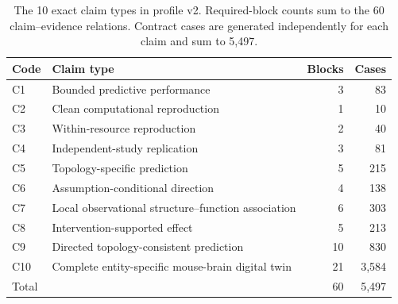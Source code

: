 \begin{table}[!htbp]
\centering
\caption{The 10 exact claim types in profile v2. Required-block counts sum to the 60 claim--evidence relations. Contract cases are generated independently for each claim and sum to 5,497.}
\label{tab:profile-v2-claims}
\footnotesize
\renewcommand{\arraystretch}{1.08}
\begin{tabularx}{\textwidth}{@{}p{}Y r r@{}}
\toprule
Code & Claim type & Blocks & Cases \\
\midrule
C1 & Bounded predictive performance & 3 & 83 \\
C2 & Clean computational reproduction & 1 & 10 \\
C3 & Within-resource reproduction & 2 & 40 \\
C4 & Independent-study replication & 3 & 81 \\
C5 & Topology-specific prediction & 5 & 215 \\
C6 & Assumption-conditional direction & 4 & 138 \\
C7 & Local observational structure--function association & 6 & 303 \\
C8 & Intervention-supported effect & 5 & 213 \\
C9 & Directed topology-consistent prediction & 10 & 830 \\
C10 & Complete entity-specific mouse-brain digital twin & 21 & 3,584 \\
\midrule
Total & & 60 & 5,497 \\
\bottomrule
\end{tabularx}
\end{table}
